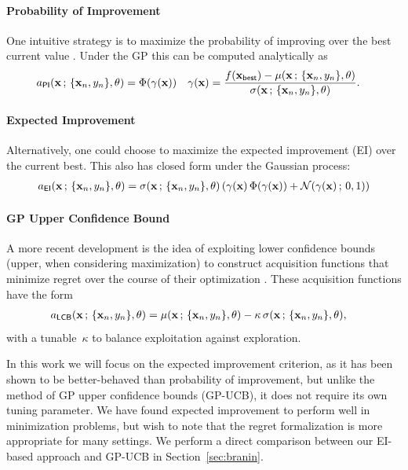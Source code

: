 \documentclass[aos,preprint]{imsart}
\begin{document}
\paragraph{Probability of Improvement}
One intuitive strategy is to maximize the probability of improving
over the best current value \citep{kushner-1964a}.  Under the GP this
can be computed analytically as
\begin{align}
  a_{\sf{PI}}(\brmx\aqhist) &= \Phi(\gamma(\brmx))
  &
  \gamma(\brmx) &= \frac{f(\brmx_{\sf{best}}) -\mu(\brmx\aqhist)}{\sigma(\brmx\aqhist)}.
\end{align}

\paragraph{Expected Improvement}
Alternatively, one could choose to maximize the expected improvement (EI)
over the current best.  This also has closed form under the Gaussian
process:
\begin{align}
  a_{\sf{EI}}(\brmx\aqhist) = \sigma(\brmx\aqhist)
  \left(
  \gamma(\brmx)\,\Phi(\gamma(\brmx)) + \distNorm(\gamma(\brmx)\,;\,0,1)
  \right)
\end{align}

\paragraph{GP Upper Confidence Bound}
A more recent development is the idea of exploiting lower confidence
bounds (upper, when considering maximization) to construct acquisition
functions that minimize regret over the course of their optimization
\citep{Srinivas2010}.  These acquisition functions have the form
\begin{align}
  a_{\sf{LCB}}(\brmx\aqhist) &= \mu(\brmx\aqhist) - \kappa\,\sigma(\brmx\aqhist),
\end{align}
with a tunable~$\kappa$ to balance exploitation against exploration.

In this work we will focus on the expected improvement criterion, as
it has been shown to be better-behaved than probability of
improvement, but unlike the method of GP upper confidence bounds
(GP-UCB), it does not require its own tuning parameter.  We have found
expected improvement to perform well in minimization problems, but
wish to note that the regret formalization is more appropriate for
many settings.  We perform a direct comparison between our EI-based
approach and GP-UCB in Section~\ref{sec:branin}.
\end{document}
